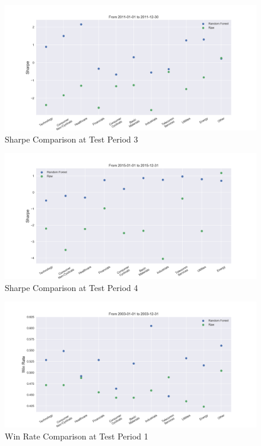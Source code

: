 \documentclass[12pt]{article}
\begin{document}
\begin{figure}[!ht]
  \begin{center}
    \includegraphics[width=1\linewidth]{figure/rf_raw_Sharpe_time_2.png}
  \end{center}
  \caption{Sharpe Comparison at Test Period 3}
  \label{fig:rf_raw_Sharpe_time_3}
\end{figure}

\begin{figure}[!ht]
  \begin{center}
    \includegraphics[width=1\linewidth]{figure/rf_raw_Sharpe_time_3.png}
  \end{center}
  \caption{Sharpe Comparison at Test Period 4}
  \label{fig:rf_raw_Sharpe_time_4}
\end{figure}

\begin{figure}[!ht]
  \begin{center}
    \includegraphics[width=1\linewidth]{figure/rf_raw_win_rate_time_0.png}
  \end{center}
  \caption{Win Rate Comparison at Test Period 1}
  \label{fig:rf_raw_win_rate_time_1}
\end{figure}
\end{document}
